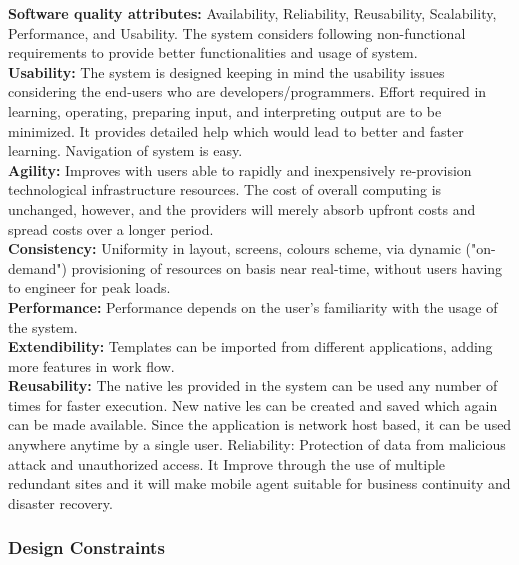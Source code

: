 \documentclass[12pt,a4paper]
{article}
\numberwithin{table}{section}
\begin{document}
{{{{{{\textbf{Software quality attributes:} Availability, Reliability, Reusability, Scalability, Performance, and Usability. The system considers following non-functional requirements to provide better functionalities and usage of system.\\

\textbf{Usability:} The system is designed keeping in mind the usability issues considering the end-users who are developers/programmers. Effort required in learning, operating, preparing input, and interpreting output are to be minimized. It provides detailed help which would lead to better and faster learning. Navigation of system is easy. \\

\textbf{Agility:} Improves with users able to rapidly and inexpensively re-provision technological infrastructure resources. The cost of overall computing is unchanged, however, and the providers will merely absorb upfront costs and spread costs over a longer period. \\

\textbf{Consistency:} Uniformity in layout, screens, colours scheme, via dynamic ("on-demand") provisioning of resources on basis near real-time, without users having to engineer for peak loads.\\ 

\textbf{Performance:} Performance depends on the user’s familiarity with the usage of the system. \\


\textbf{Extendibility:} Templates can be imported from different applications, adding more features in work flow.\\
 
\textbf{Reusability:} The native les provided in the system can be used any number of times for faster execution. New native les can be created and saved which again can be made available. Since the application is network host based, it can be used anywhere anytime by a single user. Reliability: Protection of data from malicious attack and unauthorized access. It Improve through the use of multiple redundant sites and it will make mobile agent suitable for business continuity and disaster recovery.\\



\subsubsection{Design Constraints}

}}}}}}
\end{document}
